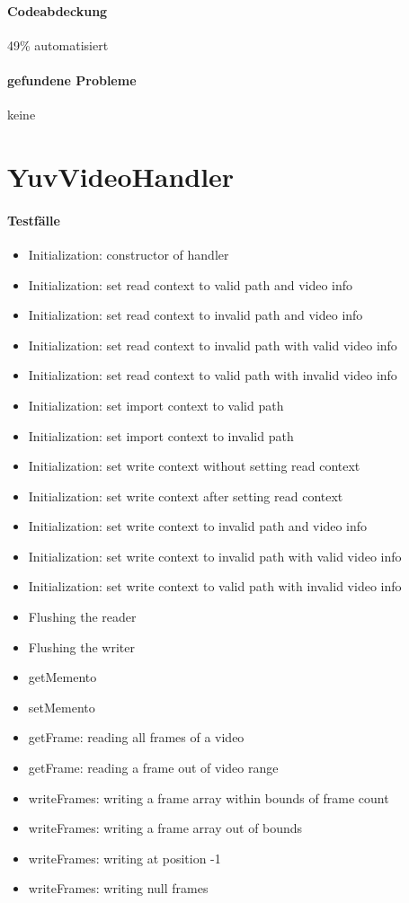 \paragraph*{Codeabdeckung}
49\% automatisiert

\paragraph*{gefundene Probleme}
keine

\section{YuvVideoHandler}
\paragraph*{Testfälle}
\begin{itemize}
\item Initialization: constructor of handler
\item Initialization: set read context to valid path and video info
\item Initialization: set read context to invalid path and video info
\item Initialization: set read context to invalid path with valid video info
\item Initialization: set read context to valid path with invalid video info
\item Initialization: set import context to valid path
\item Initialization: set import context to invalid path
\item Initialization: set write context without setting read context
\item Initialization: set write context after setting read context
\item Initialization: set write context to invalid path and video info
\item Initialization: set write context to invalid path with valid video info
\item Initialization: set write context to valid path with invalid video info
\item Flushing the reader
\item Flushing the writer
\item getMemento
\item setMemento
\item getFrame: reading all frames of a video
\item getFrame: reading a frame out of video range
\item writeFrames: writing a frame array within bounds of frame count
\item writeFrames: writing a frame array out of bounds
\item writeFrames: writing at position -1
\item writeFrames: writing null frames
\end{itemize}

